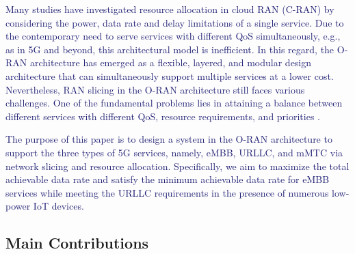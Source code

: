 \documentclass[lettersize,journal]{IEEEtran}
\begin{document}
\textcolor{MidnightBlue}{Many studies have investigated resource allocation in cloud RAN (C-RAN) by considering the power, data rate and delay limitations of a single service. Due to the contemporary need to serve services with different QoS simultaneously, e.g., as in 5G and beyond, this architectural model is inefficient. In this regard, the O-RAN architecture has emerged as a flexible, layered, and modular design architecture that can simultaneously support multiple services at a lower cost. Nevertheless, RAN slicing in the O-RAN architecture still faces various challenges. 
One of the fundamental problems lies in attaining a balance between different services with different QoS, resource requirements, and priorities \cite{ORANArch, gavrilovska2020cloud, kazemifard2021minimum, shen2020ai}.  }

\textcolor{MidnightBlue}{The purpose of this paper is to design a system in the O-RAN architecture to support the three types of 5G services, namely, eMBB, URLLC, and mMTC via network slicing and resource allocation. Specifically, we aim to maximize the total achievable data rate and satisfy the minimum achievable data rate for eMBB services while meeting the URLLC requirements in the presence of numerous low-power IoT devices.}

\subsection{Main Contributions}
\end{document}

